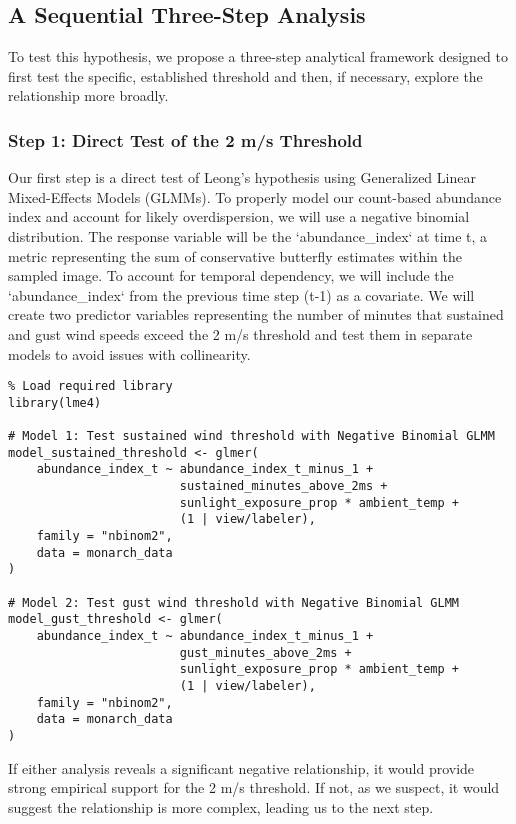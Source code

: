 \subsection{A Sequential Three-Step Analysis}

To test this hypothesis, we propose a three-step analytical framework designed to first test the specific, established threshold and then, if necessary, explore the relationship more broadly.

\subsubsection{Step 1: Direct Test of the 2 m/s Threshold}

Our first step is a direct test of Leong's hypothesis using Generalized Linear Mixed-Effects Models (GLMMs). To properly model our count-based abundance index and account for likely overdispersion, we will use a negative binomial distribution. The response variable will be the `abundance_index` at time t, a metric representing the sum of conservative butterfly estimates within the sampled image. To account for temporal dependency, we will include the `abundance_index` from the previous time step (t-1) as a covariate. We will create two predictor variables representing the number of minutes that sustained and gust wind speeds exceed the 2 m/s threshold and test them in separate models to avoid issues with collinearity.

\begin{verbatim}
% Load required library
library(lme4)

# Model 1: Test sustained wind threshold with Negative Binomial GLMM
model_sustained_threshold <- glmer(
    abundance_index_t ~ abundance_index_t_minus_1 + 
                        sustained_minutes_above_2ms + 
                        sunlight_exposure_prop * ambient_temp +
                        (1 | view/labeler),
    family = "nbinom2",
    data = monarch_data
)

# Model 2: Test gust wind threshold with Negative Binomial GLMM
model_gust_threshold <- glmer(
    abundance_index_t ~ abundance_index_t_minus_1 + 
                        gust_minutes_above_2ms + 
                        sunlight_exposure_prop * ambient_temp +
                        (1 | view/labeler),
    family = "nbinom2",
    data = monarch_data
)
\end{verbatim}

If either analysis reveals a significant negative relationship, it would provide strong empirical support for the 2 m/s threshold. If not, as we suspect, it would suggest the relationship is more complex, leading us to the next step.

